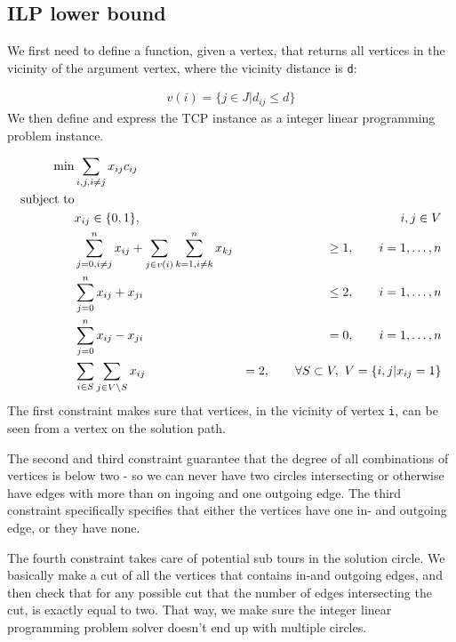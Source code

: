\subsection{ILP lower bound}

We first need to define a function, given a vertex, that returns all vertices
in the vicinity of the argument vertex, where the vicinity distance is
\texttt{d}:

\begin{align}
    v(i) = \{j \in J | d_{ij} \leq d\}
\end{align}
We then define and express the TCP instance as a integer linear programming
problem instance.

\begin{align*}
    \min             & \sum_{i,j, i \not= j} x_{ij} c_{ij} & \\
    \text{subject to}& &\\
                     & x_{ij} \in \{0,1\}, &\hspace{2em} i,j \in V\\
                     & \sum_{j=0,i\neq j}^{n} x_{ij} + \sum_{j \in v(i)} \sum_{k = 1, i \neq k}^n x_{kj}          &\geq 1, \hspace{2em} i = 1,\hdots,n \\
                     & \sum_{j = 0}^n x_{ij} + x_{ji}                   &\leq 2, \hspace{2em} i = 1,\hdots,n \\
                     & \sum_{j = 0}^n x_{ij} - x_{ji}                   &= 0, \hspace{2em} i = 1,\hdots,n \\
                     & \sum_{i \in S} \sum_{j \in V \setminus S} x_{ij} &= 2, \hspace{2em} \forall S \subset V,~ V = \{i,j | x_{ij} = 1\}
\end{align*}
The first constraint makes sure that vertices, in the vicinity of vertex
\texttt{i}, can be seen from a vertex on the solution path.

The second and third constraint guarantee that the degree of all combinations
of vertices is below two - so we can never have two circles intersecting or
otherwise have edges with more than on ingoing and one outgoing edge. The
third constraint specifically specifies that either the vertices have one in-
and outgoing edge, or they have none.

The fourth constraint takes care of potential sub tours in the solution
circle. We basically make a cut of all the vertices that contains in-and
outgoing edges, and then check that for any possible cut that the number of
edges intersecting the cut, is exactly equal to two. That way, we make sure
the integer linear programming problem solver doesn't end up with multiple
circles.
